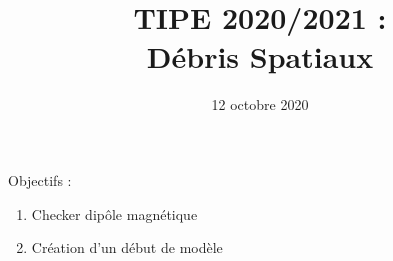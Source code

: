 \documentclass[a4paper,1pt]{article}
\title{TIPE 2020/2021 : \\ Débris Spatiaux}
\date{12 octobre 2020}
\begin{document}
\maketitle

Objectifs :
\begin{enumerate}
    \item Checker dipôle magnétique
    \item Création d'un début de modèle
\end{enumerate}
\end{document}
